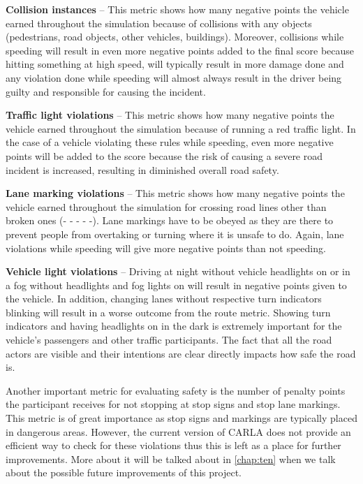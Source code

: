 \textbf{Collision instances} --
This metric shows how many negative points the vehicle earned throughout the simulation because of collisions with any objects (pedestrians, road objects, other vehicles, buildings). Moreover, collisions while speeding will result in even more negative points added to the final score because hitting something at high speed, will typically result in more damage done and any violation done while speeding will almost always result in the driver being guilty and responsible for causing the incident.

\textbf{Traffic light violations} --
This metric shows how many negative points the vehicle earned throughout the simulation because of running a red traffic light. In the case of a vehicle violating these rules while speeding, even more negative points will be added to the score 
because the risk of causing a severe road incident is increased, resulting in diminished overall road safety.

\textbf{Lane marking violations} --
This metric shows how many negative points the vehicle earned throughout the simulation for crossing road lines other than broken ones (- - - - -). Lane markings have to be obeyed as they are there to prevent people from overtaking or turning where it is unsafe to do. Again, lane violations while speeding will give more negative points than not speeding.

\textbf{Vehicle light violations} --
Driving at night without vehicle headlights on or in a fog without headlights and fog lights on will result in negative points given to the vehicle. In addition, changing lanes without respective turn indicators blinking will result in a worse outcome from the route metric. Showing turn indicators and having headlights on in the dark is extremely important for the vehicle's passengers and other traffic participants. The fact that all the road actors are visible and their intentions are clear directly impacts how safe the road is.

Another important metric for evaluating safety is the number of penalty points the participant receives for not stopping at stop signs and stop lane markings. This metric is of great importance as stop signs and markings are typically placed in dangerous areas. However, the current version of CARLA does not provide an efficient way to check for these violations thus this is left as a place for further improvements. More about it will be talked about in \autoref{chap:ten} when we talk about the possible future improvements of this project.









